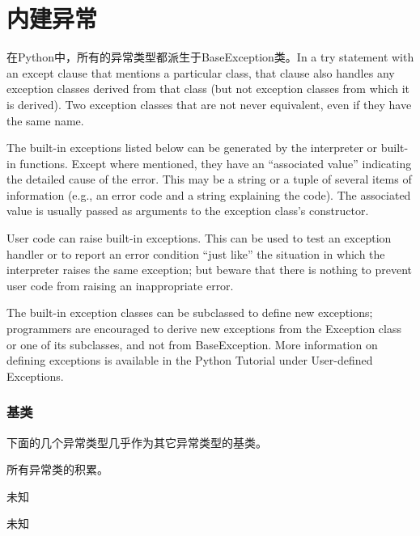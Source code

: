 \chapter{内建异常}
在Python中，所有的异常类型都派生于BaseException类。In a try statement with an except clause that mentions a particular
class, that clause also handles any exception classes derived from that class (but not exception classes from which it
is derived). Two exception classes that are not never equivalent, even if they have the same name.
\par
The built-in exceptions listed below can be generated by the interpreter or built-in functions. Except where mentioned,
they have an \textquotedblleft{associated value}\textquotedblright{} indicating the detailed cause of the error. This
may be a string or a tuple of several items of information (e.g., an error code and a string explaining the code). The
associated value is usually passed as arguments to the exception class’s constructor.
\par
User code can raise built-in exceptions. This can be used to test an exception handler or to report an error condition
\textquotedblleft{just like}\textquotedblright{} the situation in which the interpreter raises the same exception; but
beware that there is nothing to prevent user code from raising an inappropriate error.
\par
The built-in exception classes can be subclassed to define new exceptions; programmers are encouraged to derive new
exceptions from the Exception class or one of its subclasses, and not from BaseException. More information on defining
exceptions is available in the Python Tutorial under User-defined Exceptions.
\par

\subsection{基类}
下面的几个异常类型几乎作为其它异常类型的基类。

\noindent{\color{red}{exception BaseException:}}
\par{所有异常类的积累。}\\

\noindent{\color{red}{excetion Exception:}}
\par{未知}\\

\noindent{\color{red}{exception ArithmeticError:}}
\par{未知}\\

